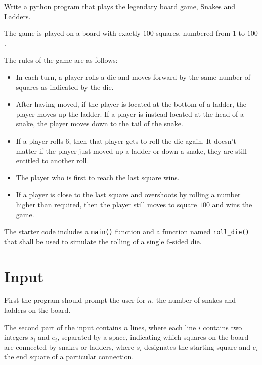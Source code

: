 


Write a python program that plays the legendary board game,
\href{https://en.wikipedia.org/wiki/Snakes_and_Ladders}{Snakes and Ladders}.

The game is played on a board with exactly $100$ squares, numbered from $1$ to $100$.

The rules of the game are as follows:

\begin{itemize}
    \item In each turn, a player rolls a die and moves forward by the same number of squares as indicated by the die.
    
    \item After having moved, if the player is located at the bottom of a ladder, the player moves up the ladder.
    If a player is instead located at the head of a snake, the player moves down to the tail of the snake.
    
    \item If a player rolls $6$, then that player gets to roll the die again.
    It doesn't matter if the player just moved up a ladder or down a snake, they are still entitled to another roll.
    
    \item The player who is first to reach the last square wins.
    
    \item  If a player is close to the last square and overshoots by rolling a number higher than required, 
    then the player still moves to square $100$ and wins the game.
\end{itemize}

The starter code includes a \texttt{main()} function and a function 
named \texttt{roll\_die()} that shall be used to simulate the rolling of a single $6$-sided die.

\section*{Input}

First the program should prompt the user for $n$, the number of snakes and ladders on the board.

The second part of the input contains $n$ lines,
where each line $i$ contains two integers $s_i$ and $e_i$, separated by a space,
indicating which squares on the board are connected by snakes or ladders,
where $s_i$ designates the starting square and $e_i$ the end square of a particular connection.

